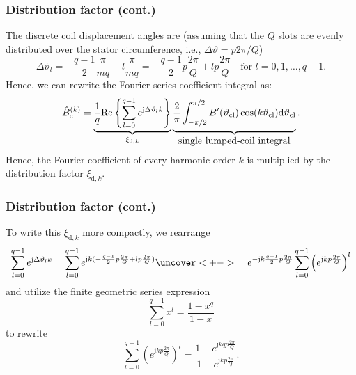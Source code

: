 \begin{frame}
	\frametitle{Distribution factor  (cont.)}
   The discrete coil displacement angles are (assuming that the $Q$ slots are evenly distributed over the stator circumference, i.e., $\Delta \vartheta = p 2  \pi/Q$)
   \begin{equation}
    \Delta\vartheta_l = -\frac{q-1}{2} \frac{\pi}{m q} + l \frac{\pi}{m q} = -\frac{q-1}{2} p \frac{2\pi}{Q} + l p \frac{2\pi}{Q} \quad \mbox{for } l=0,1,\ldots,q-1.
   \end{equation}\pause
   Hence, we can rewrite the Fourier series coefficient integral as:
   \begin{equation}
    \hat{B}_{\mathrm{c}}^{(k)} = \underbrace{\frac{1}{q}\mathrm{Re}\left\{\sum_{l=0}^{q-1} e^{\mathrm{j} \Delta\vartheta_l k}\right\} }_{\xi_{\mathrm{d},k}} \underbrace{\frac{2}{\pi}\int_{-\pi/2}^{\pi/2} B'(\vartheta_\mathrm{el}) \cos(k \vartheta_\mathrm{el}) \mathrm{d}\vartheta_\mathrm{el} \vphantom{\sum_{l=0}^{q-1}}}_{\mbox{single lumped-coil integral}}.
    \label{eq:B_single_phase_coil_fourier_series_coefficients_distributed}
\end{equation}
Hence, the Fourier coefficient of every harmonic order $k$ is multiplied by the distribution factor $\xi_{\mathrm{d},k}$. 
\end{frame}

\begin{frame}
	\frametitle{Distribution factor  (cont.)}
    \onslide<+->
    To write this $\xi_{\mathrm{d},k}$ more compactly, we rearrange 
    \begin{equation}
        \sum_{l=0}^{q-1} e^{\mathrm{j} \Delta\vartheta_l k} = \sum_{l=0}^{q-1} e^{\mathrm{j} k (-\frac{q-1}{2} p \frac{2\pi}{Q} + l p \frac{2\pi}{Q})} \uncover<+->{= e^{- \mathrm{j} k \frac{q-1}{2} p \frac{2\pi}{Q}} \sum_{l=0}^{q-1} \left(e^{\mathrm{j} k  p \frac{2\pi}{Q}}\right)^l}
        \label{eq:sum_exp_distribution_factor}
    \end{equation}
    \onslide<+->
    and utilize the finite geometric series expression
    $$
    \sum_{l=0}^{q-1} x^l = \frac{1-x^q}{1-x}
    $$
    \onslide<+->
    to rewrite
    $$
    \sum_{l=0}^{q-1} \left(e^{\mathrm{j} k  p \frac{2\pi}{Q}}\right)^l = \frac{1-e^{\mathrm{j} k q p \frac{2\pi}{Q}}}{1-e^{\mathrm{j} k  p \frac{2\pi}{Q}}}.
    $$
\end{frame}

